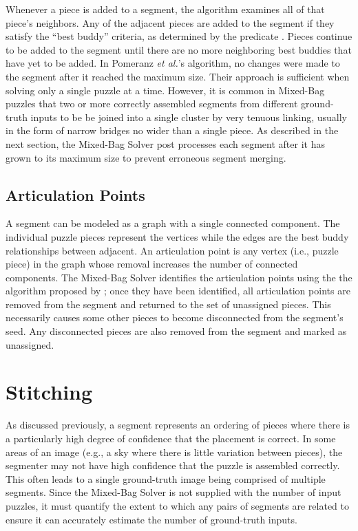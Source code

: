 Whenever a piece is added to a segment, the algorithm examines all of that piece's neighbors.  Any of the adjacent pieces are added to the segment if they satisfy the ``best buddy'' criteria, as determined by the predicate .  Pieces continue to be added to the segment until there are no more neighboring best buddies that have yet to be added. In Pomeranz \textit{et al.}'s algorithm, no changes were made to the segment after it reached the maximum size.  Their approach is sufficient when solving only a single puzzle at a time.  However, it is common in Mixed-Bag puzzles that two or more correctly assembled segments from different ground-truth inputs to be be joined into a single cluster by very tenuous linking, usually in the form of narrow bridges no wider than a single piece.  As described in the next section, the Mixed-Bag Solver post processes each segment after it has grown to its maximum size to prevent erroneous segment merging.

\subsection{Articulation Points}\label{sec:articulationPoints}

A segment can be modeled as a graph with a single connected component.  The individual puzzle pieces represent the vertices while the edges are the best buddy relationships between adjacent.  An articulation point is any vertex (i.e., puzzle piece) in the graph whose removal increases the number of connected components.  The Mixed-Bag Solver identifies the articulation points using the the algorithm proposed by \cite{cormenIntroToAlgorithms}; once they have been identified, all articulation points are removed from the segment and returned to the set of unassigned pieces.  This necessarily causes some other pieces to become disconnected from the segment's seed.  Any disconnected pieces are also removed from the segment and marked as unassigned.  

\section{Stitching}\label{sec:stitching}

As discussed previously, a segment represents an ordering of pieces where there is a particularly high degree of confidence that the placement is correct.  In some areas of an image (e.g., a sky where there is little variation between pieces), the segmenter may not have high confidence that the puzzle is assembled correctly.  This often leads to a single ground-truth image being comprised of multiple segments. Since the Mixed-Bag Solver is not supplied with the number of input puzzles, it must quantify the extent to which any pairs of segments are related to ensure it can accurately estimate the number of ground-truth inputs.  

